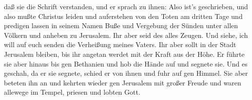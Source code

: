 daß sie die Schrift verstanden,  und er sprach zu ihnen:
Also ist's geschrieben, und also mußte Christus leiden und auferstehen
von den Toten am dritten Tage  und predigen lassen in
seinem Namen Buße und Vergebung der Sünden unter allen Völkern und
anheben zu Jerusalem.  Ihr aber seid des alles Zeugen.
 Und siehe, ich will auf euch senden die Verheißung meines
Vaters. Ihr aber sollt in der Stadt Jerusalem bleiben, bis ihr angetan
werdet mit der Kraft aus der Höhe.  Er führte sie aber
hinaus bis gen Bethanien und hob die Hände auf und segnete sie.
 Und es geschah, da er sie segnete, schied er von ihnen und
fuhr auf gen Himmel.  Sie aber beteten ihn an und kehrten
wieder gen Jerusalem mit großer Freude  und waren allewege
im Tempel, priesen und lobten Gott.
